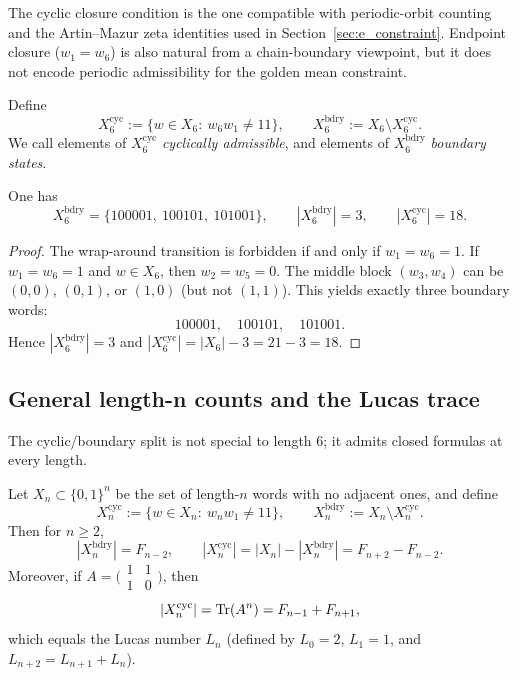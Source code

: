 \begin{remark}
The cyclic closure condition is the one compatible with periodic-orbit counting and the Artin--Mazur zeta identities used in Section~\ref{sec:e_constraint}.
Endpoint closure ($w_1=w_6$) is also natural from a chain-boundary viewpoint, but it does not encode periodic admissibility for the golden mean constraint.
\end{remark}

\begin{definition}
Define
\[
X_6^{\mathrm{cyc}}:=\{w\in X_6:\ w_6w_1\neq 11\},
\qquad
X_6^{\mathrm{bdry}}:=X_6\setminus X_6^{\mathrm{cyc}}.
\]
We call elements of $X_6^{\mathrm{cyc}}$ \emph{cyclically admissible}, and elements of $X_6^{\mathrm{bdry}}$ \emph{boundary states}.
\end{definition}

\begin{proposition}
\label{prop:boundary_3}
One has
\[
X_6^{\mathrm{bdry}}=\{100001,\ 100101,\ 101001\},
\qquad |X_6^{\mathrm{bdry}}|=3,
\qquad |X_6^{\mathrm{cyc}}|=18.
\]
\end{proposition}

\begin{proof}
The wrap-around transition is forbidden if and only if $w_1=w_6=1$.
If $w_1=w_6=1$ and $w\in X_6$, then $w_2=w_5=0$.
The middle block $(w_3,w_4)$ can be $(0,0)$, $(0,1)$, or $(1,0)$ (but not $(1,1)$).
This yields exactly three boundary words:
\[
100001,\quad 100101,\quad 101001.
\]
Hence $|X_6^{\mathrm{bdry}}|=3$ and $|X_6^{\mathrm{cyc}}|=|X_6|-3=21-3=18$.
\end{proof}

\subsection{General length-n counts and the Lucas trace}
The cyclic/boundary split is not special to length $6$; it admits closed formulas at every length.

\begin{proposition}
\label{prop:cyclic_boundary_general}
Let $X_n\subset\{0,1\}^n$ be the set of length-$n$ words with no adjacent ones, and define
\[
X_n^{\mathrm{cyc}}:=\{w\in X_n:\ w_n w_1\neq 11\},
\qquad
X_n^{\mathrm{bdry}}:=X_n\setminus X_n^{\mathrm{cyc}}.
\]
Then for $n\ge 2$,
\[
|X_n^{\mathrm{bdry}}|=F_{n-2},
\qquad
|X_n^{\mathrm{cyc}}|=|X_n|-|X_n^{\mathrm{bdry}}|=F_{n+2}-F_{n-2}.
\]
Moreover, if $A=\bigl(\begin{smallmatrix}1&1\\ 1&0\end{smallmatrix}\bigr)$, then
\[
|X_n^{\mathrm{cyc}}|=\mathrm{Tr}(A^n)=F_{n-1}+F_{n+1},
\]
which equals the Lucas number $L_n$ (defined by $L_0=2$, $L_1=1$, and $L_{n+2}=L_{n+1}+L_n$).
\end{proposition}

